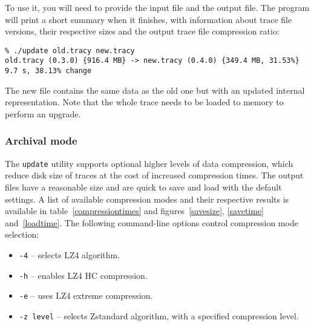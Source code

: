 \documentclass[hidelinks,titlepage,a4paper,twoside]{article}
\begin{document}
To use it, you will need to provide the input file and the output file. The program will print a short summary when it finishes, with information about trace file versions, their respective sizes and the output trace file compression ratio:

\begin{verbatim}
% ./update old.tracy new.tracy
old.tracy (0.3.0) {916.4 MB} -> new.tracy (0.4.0) {349.4 MB, 31.53%}  9.7 s, 38.13% change
\end{verbatim}

The new file contains the same data as the old one but with an updated internal representation. Note that the whole trace needs to be loaded to memory to perform an upgrade.

\subsubsection{Archival mode}
\label{archival}

The \texttt{update} utility supports optional higher levels of data compression, which reduce disk size of traces at the cost of increased compression times. The output files have a reasonable size and are quick to save and load with the default settings. A list of available compression modes and their respective results is available in table~\ref{compressiontimes} and figures~\ref{savesize}, \ref{savetime} and~\ref{loadtime}. The following command-line options control compression mode selection:

\begin{itemize}
\item \texttt{-4} -- selects LZ4 algorithm.
\item \texttt{-h} -- enables LZ4 HC compression.
\item \texttt{-e} -- uses LZ4 extreme compression.
\item \texttt{-z level} -- selects Zstandard algorithm, with a specified compression level.
\end{itemize}
\end{document}

